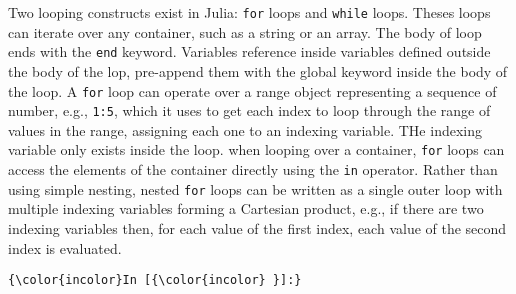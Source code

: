 \documentclass[11pt]{article}
\begin{document}
Two looping constructs exist in Julia: \texttt{for} loops and
\texttt{while} loops. Theses loops can iterate over any container, such
as a string or an array. The body of loop ends with the \texttt{end}
keyword. Variables reference inside variables defined outside the body
of the lop, pre-append them with the global keyword inside the body of
the loop. A \texttt{for} loop can operate over a range object
representing a sequence of number, e.g., \texttt{1:5}, which it uses to
get each index to loop through the range of values in the range,
assigning each one to an indexing variable. THe indexing variable only
exists inside the loop. when looping over a container, \texttt{for}
loops can access the elements of the container directly using the
\texttt{in} operator. Rather than using simple nesting, nested
\texttt{for} loops can be written as a single outer loop with multiple
indexing variables forming a Cartesian product, e.g., if there are two
indexing variables then, for each value of the first index, each value
of the second index is evaluated.

    \begin{Verbatim}[commandchars=\\\{\}]
{\color{incolor}In [{\color{incolor} }]:} 
\end{Verbatim}


    
    
    
    
\end{document}
